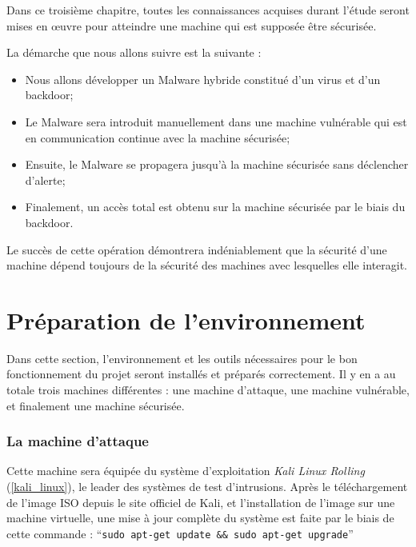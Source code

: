 
Dans ce troisième chapitre, toutes les connaissances acquises durant l'étude seront mises en œuvre pour atteindre
une machine qui est supposée être sécurisée. %

La démarche que nous allons suivre est la suivante : 
\begin{itemize}
    \item Nous allons développer un Malware hybride constitué d'un virus et d'un backdoor;
    \item Le Malware sera introduit manuellement dans une machine vulnérable qui est en communication continue
        avec la machine sécurisée;
    \item Ensuite, le Malware se propagera jusqu'à la machine sécurisée sans déclencher d'alerte;
    \item Finalement, un accès total est obtenu sur la machine sécurisée par le biais du backdoor.
\end{itemize}%

Le succès de cette opération démontrera indéniablement que la sécurité d'une machine dépend toujours
de la sécurité des machines avec lesquelles elle interagit.%

\newpage

\section{Préparation de l'environnement} \label{preparation_environnement}
Dans cette section, l'environnement et les outils nécessaires pour le bon fonctionnement du projet seront installés
et préparés correctement. Il y en a au totale trois machines différentes : une machine d'attaque, une machine vulnérable,
et finalement une machine sécurisée. %

    \subsubsection{La machine d'attaque} 
    Cette machine sera équipée du système d'exploitation \emph{Kali Linux \cite{linux} Rolling} 
    (\autoref{kali_linux}), le 
    leader des systèmes de test d'intrusions. Après le téléchargement de l'image
    ISO depuis le site officiel de Kali, et l'installation de l'image sur
    une machine virtuelle, une mise à jour complète du système est faite par le biais de cette commande : 
    ``\texttt{sudo apt-get update \&\& sudo apt-get upgrade}''  %

